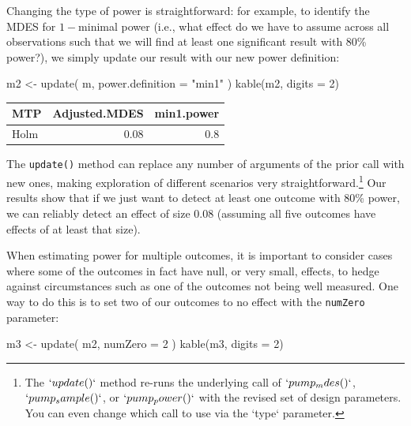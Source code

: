 \documentclass[
]{article}
\newenvironment{Shaded}{\begin{snugshade}}{\end{snugshade}}
\newcommand{\AttributeTok}[1]{\textcolor[rgb]{0.77,0.63,0.00}{#1}}
\newcommand{\DecValTok}[1]{\textcolor[rgb]{0.00,0.00,0.81}{#1}}
\newcommand{\FunctionTok}[1]{\textcolor[rgb]{0.00,0.00,0.00}{#1}}
\newcommand{\NormalTok}[1]{#1}
\newcommand{\OtherTok}[1]{\textcolor[rgb]{0.56,0.35,0.01}{#1}}
\newcommand{\StringTok}[1]{\textcolor[rgb]{0.31,0.60,0.02}{#1}}
\begin{document}
Changing the type of power is straightforward: for example, to identify
the MDES for \(1-\)minimal power (i.e., what effect do we have to assume
across all observations such that we will find at least one significant
result with 80\% power?), we simply update our result with our new power
definition:

\begin{Shaded}
\begin{Highlighting}[]
\NormalTok{m2 }\OtherTok{\textless{}{-}} \FunctionTok{update}\NormalTok{( m, }\AttributeTok{power.definition =} \StringTok{"min1"}\NormalTok{ )}
\FunctionTok{kable}\NormalTok{(m2, }\AttributeTok{digits =} \DecValTok{2}\NormalTok{)}
\end{Highlighting}
\end{Shaded}

\begin{tabular}{l|r|r}
\hline
MTP & Adjusted.MDES & min1.power\\
\hline
Holm & 0.08 & 0.8\\
\hline
\end{tabular}

The \texttt{update()} method can replace any number of arguments of the
prior call with new ones, making exploration of different scenarios very
straightforward.\footnote{The $`update()`$ method re-runs the underlying call of $`pump_mdes()`$, $`pump_sample()`$, or $`pump_power()`$ with the revised set of design parameters. You can even change which call to use via the `type` parameter.}
Our results show that if we just want to detect at least one outcome
with 80\% power, we can reliably detect an effect of size \(0.08\)
(assuming all five outcomes have effects of at least that size).

When estimating power for multiple outcomes, it is important to consider
cases where some of the outcomes in fact have null, or very small,
effects, to hedge against circumstances such as one of the outcomes not
being well measured. One way to do this is to set two of our outcomes to
no effect with the \texttt{numZero} parameter:

\begin{Shaded}
\begin{Highlighting}[]
\NormalTok{m3 }\OtherTok{\textless{}{-}} \FunctionTok{update}\NormalTok{( m2, }\AttributeTok{numZero =} \DecValTok{2}\NormalTok{ )}
\FunctionTok{kable}\NormalTok{(m3, }\AttributeTok{digits =} \DecValTok{2}\NormalTok{)}
\end{Highlighting}
\end{Shaded}
\end{document}

